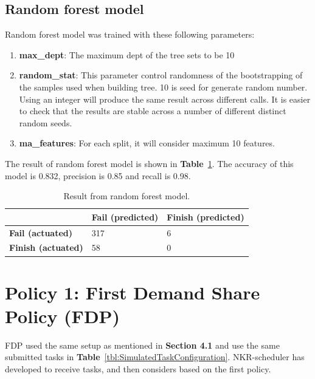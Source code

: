 \documentclass[12pt,oneside,openright,a4paper]{cpe-english-project}
\begin{document}
\subsection{Random forest model}  
\hspace{10mm}Random forest model was trained with these following parameters: 
\begin{enumerate}
  \item \textbf{max\_dept}: The maximum dept of the tree sets to be 10
  \item \textbf{random\_stat}: This parameter control randomness of the bootstrapping of the samples used when building tree. 10 is seed for generate random number. Using an integer will produce the same result across different calls. It is easier to check that the results are stable across a number of different distinct random seeds.
  \item \textbf{ma\_features}: For each split, it will consider maximum 10 features.
\end{enumerate}
\hspace{10mm}The result of random forest model is shown in \textbf{Table}~\ref{tbl:RandomForestConfusion}. The accuracy of this model is 0.832, precision is 0.85 and recall is 0.98.

\begin{table}[!h]
  \caption{Result from random forest model.}\label{tbl:RandomForestConfusion}
  \begin{tabular}{@{}|p{}|p{}|p{}|}
   \hline
   \textbf{} & \textbf{Fail (predicted)} & \textbf{Finish (predicted)} \\ 
   \hline
   \textbf{Fail (actuated)} & 317 & 6 \\ 
   \hline
   \textbf{Finish (actuated)} & 58 & 0 \\ 
   \hline                     
  \end{tabular}
\end{table}

\section{Policy 1: First Demand Share Policy (FDP)}  
\hspace{10mm}FDP used the same setup as mentioned in \textbf{Section 4.1} and use the same submitted tasks in \textbf{Table}~\ref{tbl:SimulatedTaskConfiguration}. NKR-scheduler has developed to receive tasks, and then considers based on the first policy. 
\end{document}
